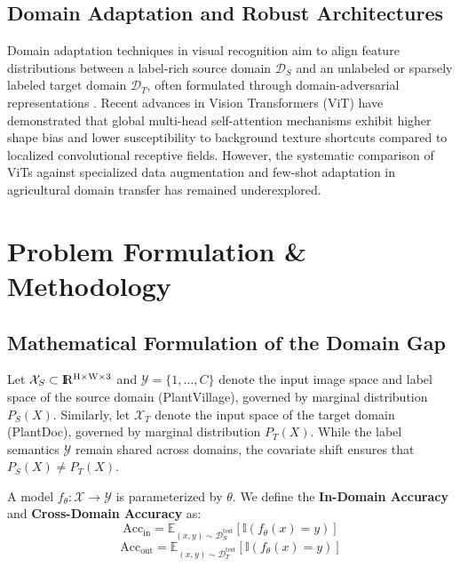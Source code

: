 \documentclass[twoside,a4paper,11pt]{article}
\newcommand{\Runo}{\rm I\hspace{-0.55ex}R}
\begin{document}
\subsection{Domain Adaptation and Robust Architectures}
Domain adaptation techniques in visual recognition aim to align feature distributions between a label-rich source domain $\mathcal{D}_S$ and an unlabeled or sparsely labeled target domain $\mathcal{D}_T$, often formulated through domain-adversarial representations \cite{Ganin:16}. Recent advances in Vision Transformers (ViT) \cite{Dosovitskiy:20} have demonstrated that global multi-head self-attention mechanisms exhibit higher shape bias and lower susceptibility to background texture shortcuts compared to localized convolutional receptive fields. However, the systematic comparison of ViTs against specialized data augmentation and few-shot adaptation in agricultural domain transfer has remained underexplored.

\section{Problem Formulation \& Methodology}

\subsection{Mathematical Formulation of the Domain Gap}
Let $\mathcal{X}_S \subset \Runo^{H \times W \times 3}$ and $\mathcal{Y} = \{1, \dots, C\}$ denote the input image space and label space of the source domain (PlantVillage), governed by marginal distribution $P_S(X)$. Similarly, let $\mathcal{X}_T$ denote the input space of the target domain (PlantDoc), governed by marginal distribution $P_T(X)$. While the label semantics $\mathcal{Y}$ remain shared across domains, the covariate shift ensures that $P_S(X) \neq P_T(X)$.

A model $f_\theta: \mathcal{X} \rightarrow \mathcal{Y}$ is parameterized by $\theta$. We define the \textbf{In-Domain Accuracy} and \textbf{Cross-Domain Accuracy} as:
\begin{equation}
\text{Acc}_{\text{in}} = \mathbb{E}_{(x, y) \sim \mathcal{D}_S^{\text{test}}} \left[ \mathbb{I}(f_\theta(x) = y) \right]
\end{equation}
\begin{equation}
\text{Acc}_{\text{out}} = \mathbb{E}_{(x, y) \sim \mathcal{D}_T^{\text{test}}} \left[ \mathbb{I}(f_\theta(x) = y) \right]
\end{equation}
\end{document}
